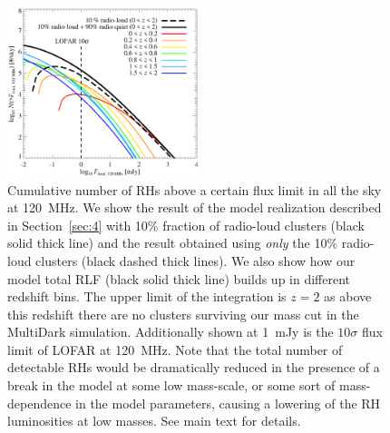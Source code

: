 \documentclass[traditabstract]{aa}
\begin{document}
\begin{figure}[hbt!]
\centering
\includegraphics[width=0.5\textwidth]{figures/RLF_LOFAR_flux.eps}
\caption{Cumulative number of RHs above a certain flux limit in all the sky at 120~MHz. We show the result of the model realization described in Section~\ref{sec:4} with 10\% fraction of radio-loud clusters (black solid thick line) and the result obtained using \emph{only} the 10\% radio-loud clusters (black dashed thick lines). We also show how our model total RLF (black solid thick line) builds up in different redshift bins.
The upper limit of the integration is $z = 2$ as above this redshift there are no clusters surviving our mass cut in the MultiDark simulation. Additionally shown at 1~mJy is the $10\sigma$ flux limit of LOFAR at 120~MHz. Note that the total number of detectable RHs would be dramatically reduced in the presence of a break in the model at some low mass-scale, or some sort of mass-dependence in the model parameters, causing a lowering of the RH luminosities at low masses. See main text for details.
}
\label{fig:RLF_120_flux}
\end{figure}
\end{document}
